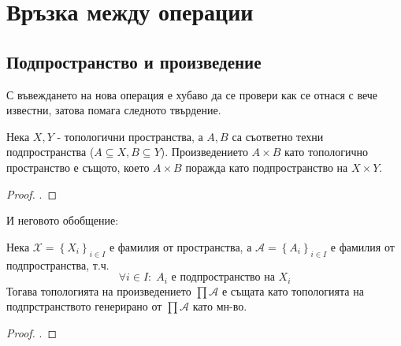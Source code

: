 \section{Връзка между операции}
\subsection{Подпространство и произведение}
С въвеждането на нова операция е хубаво да се провери как се отнася с вече известни, затова помага следното твърдение.
\begin{proposition}
    Нека $X, Y$ - топологични пространства, а $A, B$ са съответно техни подпространства ($A \subseteq X, B \subseteq Y$). Произведението $A \times B$ като топологично пространство е същото, което $A \times B$ поражда като подпространство на $X \times Y$.
\end{proposition}
\begin{proof}
    \cite[p.~87]{munkrestopology}.
\end{proof}
И неговото обобщение:
\begin{proposition}
    Нека $\mathcal X = \left\{X_i\right\}_{i\in I}$ е фамилия от пространства, а $\mathcal A = \left\{A_i\right\}_{i\in I}$ е фамилия от подпространства, т.ч.
    \begin{equation}
        \forall i \in I:\; A_i \text{ е подпространство на } X_i
    \end{equation}
    Тогава топологията на произведението $\prod \mathcal A$ е същата като топологията на подпрстранството генерирано от $\prod \mathcal A$ като мн-во.
\end{proposition}
\begin{proof}
    \cite[p.~78]{engelking1989general}.
\end{proof}

